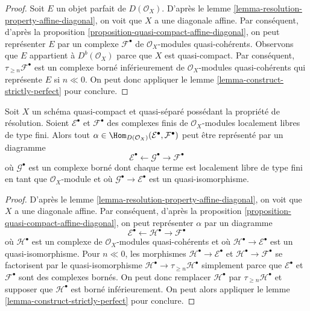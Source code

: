 \begin{proof}
Soit $E$ un objet parfait de $D(\mathcal{O}_X)$.
D'après le lemme \ref{lemma-resolution-property-affine-diagonal},
on voit que $X$ a une diagonale affine. Par conséquent, d'après la
proposition \ref{proposition-quasi-compact-affine-diagonal},
on peut représenter $E$ par un complexe $\mathcal{F}^\bullet$
de $\mathcal{O}_X$-modules quasi-cohérents.
Observons que $E$ appartient à $D^b(\mathcal{O}_X)$ parce que
$X$ est quasi-compact. Par conséquent, $\tau_{\geq n}\mathcal{F}^\bullet$
est un complexe borné inférieurement de $\mathcal{O}_X$-modules quasi-cohérents
qui représente $E$ si $n \ll 0$. On peut donc appliquer le
lemme \ref{lemma-construct-strictly-perfect} pour conclure.
\end{proof}

\begin{lemma}
\label{lemma-resolution-property-map-perfect-complex}
Soit $X$ un schéma quasi-compact et quasi-séparé possédant la
propriété de résolution. Soient $\mathcal{E}^\bullet$ et $\mathcal{F}^\bullet$
des complexes finis de $\mathcal{O}_X$-modules localement libres de type fini.
Alors tout
$\alpha \in \Hom_{D(\mathcal{O}_X)}(\mathcal{E}^\bullet, \mathcal{F}^\bullet)$
peut être représenté par un diagramme
$$
\mathcal{E}^\bullet \leftarrow \mathcal{G}^\bullet \to \mathcal{F}^\bullet
$$
où $\mathcal{G}^\bullet$ est un complexe borné dont chaque terme est localement libre de type fini en tant que
$\mathcal{O}_X$-module et où $\mathcal{G}^\bullet \to \mathcal{E}^\bullet$
est un quasi-isomorphisme.
\end{lemma}

\begin{proof}
D'après le lemme \ref{lemma-resolution-property-affine-diagonal},
on voit que $X$ a une diagonale affine. Par conséquent, d'après la
proposition \ref{proposition-quasi-compact-affine-diagonal},
on peut représenter $\alpha$ par un diagramme
$$
\mathcal{E}^\bullet \leftarrow \mathcal{H}^\bullet \to \mathcal{F}^\bullet
$$
où $\mathcal{H}^\bullet$ est un complexe de
$\mathcal{O}_X$-modules quasi-cohérents et où
$\mathcal{H}^\bullet \to \mathcal{E}^\bullet$
est un quasi-isomorphisme. Pour $n \ll 0$, les morphismes
$\mathcal{H}^\bullet \to \mathcal{E}^\bullet$ et
$\mathcal{H}^\bullet \to \mathcal{F}^\bullet$
se factorisent par le quasi-isomorphisme
$\mathcal{H}^\bullet \to \tau_{\geq n}\mathcal{H}^\bullet$
simplement parce que $\mathcal{E}^\bullet$ et $\mathcal{F}^\bullet$
sont des complexes bornés. On peut donc remplacer $\mathcal{H}^\bullet$
par $\tau_{\geq n}\mathcal{H}^\bullet$ et supposer que $\mathcal{H}^\bullet$
est borné inférieurement.
On peut alors appliquer le
lemme \ref{lemma-construct-strictly-perfect} pour conclure.
\end{proof}

